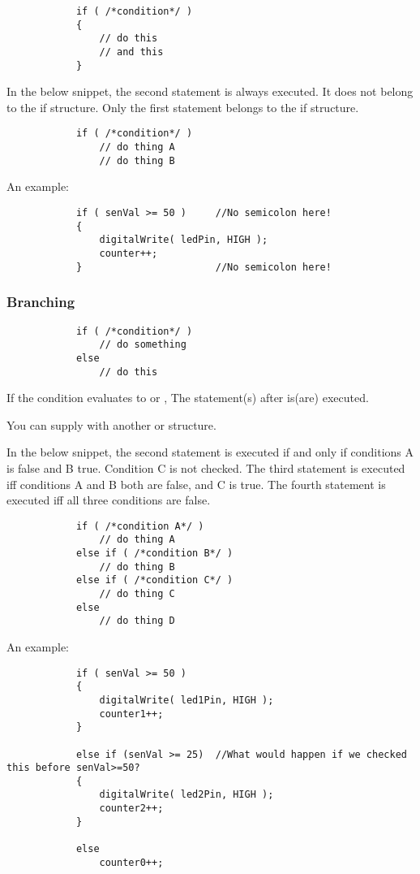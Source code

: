 \documentclass{article}
\begin{document}
			\begin{lstlisting}
			if ( /*condition*/ )
			{
				// do this
				// and this
			}
			\end{lstlisting}

			In the below snippet, the second statement is always executed. It does not belong to the if structure. Only the first statement belongs to the if structure.

			\begin{lstlisting}
			if ( /*condition*/ )
				// do thing A
				// do thing B
			\end{lstlisting}

			An example:

			\begin{lstlisting}
			if ( senVal >= 50 )		//No semicolon here!
			{
				digitalWrite( ledPin, HIGH );
				counter++;
			}						//No semicolon here!
			\end{lstlisting}

		\subsubsection{Branching}

			\begin{lstlisting}
			if ( /*condition*/ )
				// do something
			else 
				// do this
			\end{lstlisting}

			If the condition evaluates to  or , The statement(s) after  is(are) executed.

			You can supply  with another  or  structure. 

			In the below snippet, the second statement is executed if and only if conditions A is false and B true. Condition C is not checked. The third statement is executed iff conditions A and B both are false, and C is true. The fourth statement is executed iff all three conditions are false.

			\begin{lstlisting}
			if ( /*condition A*/ )
				// do thing A
			else if ( /*condition B*/ )
				// do thing B
			else if ( /*condition C*/ )
				// do thing C
			else
				// do thing D
			\end{lstlisting}

			An example:

			\begin{lstlisting}
			if ( senVal >= 50 )
			{
				digitalWrite( led1Pin, HIGH );
				counter1++;
			}

			else if (senVal >= 25)	//What would happen if we checked this before senVal>=50?
			{
				digitalWrite( led2Pin, HIGH );
				counter2++;
			}

			else 
				counter0++;

			\end{lstlisting}
\end{document}
